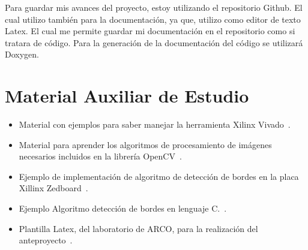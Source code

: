 \documentclass{pre-tfg}
\begin{document}
Para guardar mis avances del proyecto, estoy utilizando el repositorio Github. El cual utilizo también para la documentación, ya que, utilizo como editor de texto Latex. El cual me permite guardar mi documentación en el repositorio como si tratara de código. Para la generación de la documentación del código se utilizará Doxygen.


\section{Material Auxiliar de Estudio}


%

\begin{itemize}
\item Material con ejemplos para saber manejar la herramienta Xilinx Vivado~\cite{Zynq}.
\item Material para aprender los algoritmos de procesamiento de imágenes necesarios incluidos en la librería OpenCV~\cite{Open}.
\item Ejemplo de implementación de algoritmo de detección de bordes en la placa Xillinx Zedboard~\cite{SobelZedboard}.
\item Ejemplo Algoritmo detección de bordes en lenguaje C.~\cite{Sobel}.
\item Plantilla Latex, del laboratorio de ARCO, para la realización del anteproyecto~\cite{Latex}.
\end{itemize}
\end{document}
